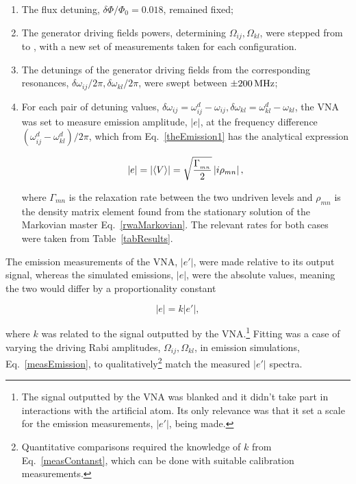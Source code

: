   \begin{enumerate}
  	\item The flux detuning, $ \delta\Phi/\Phi_0=0.018 $, remained fixed;
  	\item The generator driving fields powers, determining $ \Omega_{ij}, \Omega_{kl} $, were stepped from  to , with a new set of measurements taken for each configuration.  
  	\item The detunings of the generator driving fields from the corresponding resonances, $ \delta\omega_{ij}/2\pi, \delta\omega_{kl}/2\pi $, were swept between $ \pm200\,\text{MHz} $;
  	\item For each pair of detuning values, $ \delta\omega_{ij} = \omega_{ij}^{d}-\omega_{ij}, \delta\omega_{kl} = \omega_{kl}^{d}-\omega_{kl}$, the VNA was set to measure emission amplitude, $ |e| $, at the frequency difference $ (\omega_{ij}^{d}-\omega_{kl}^{d})/2\pi $, which from Eq.~\eqref{theEmission1} has the analytical expression
  	
  	\begin{equation}\label{measEmission}
  		|e|=\left| \left\langle V\right\rangle\right| =  \sqrt{\frac{\Gamma_{_{mn}}}{2}}\left|i\rho_{mn}\right|,
  	\end{equation}
  	
  	\noindent where $ \Gamma_{mn} $ is the \ra{} relaxation rate between the two undriven levels and $ \rho_{mn} $ is the density matrix element found from the stationary solution of the Markovian master Eq.~\eqref{rwaMarkovian}. The relevant rates for both cases were taken from Table~\ref{tabResults}.
  \end{enumerate}

  The emission measurements of the VNA, $ \left|e'\right| $, were made relative to its output signal, whereas the simulated emissions, $ |e| $, were the absolute values, meaning the two would differ by a proportionality constant
   
  \begin{equation}\label{measContanst}
	  |e| = k|e'|,
  \end{equation}
  
  \noindent where $ k $ was related to the signal outputted by the VNA.\footnote{The signal outputted by the VNA was blanked and it didn't take part in interactions with the artificial atom. Its only relevance was that it set a scale for the emission measurements, $ |e'| $, being made.} Fitting was a case of varying the driving Rabi amplitudes, $ \Omega_{ij}, \Omega_{kl} $, in emission simulations, Eq.~\eqref{measEmission}, to qualitatively\footnote{Quantitative comparisons required the knowledge of $ k $ from Eq.~\eqref{measContanst}, which can be done with suitable calibration measurements.} match the measured $ |e'| $ spectra.
  
